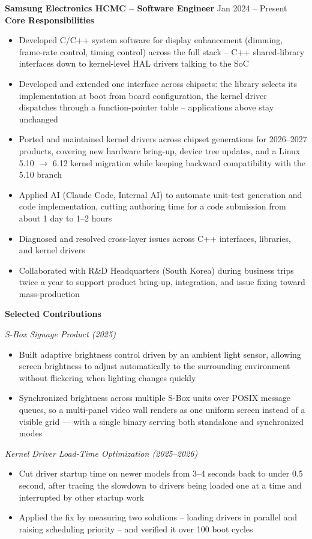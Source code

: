 \documentclass[a4paper,10pt]{article}
\newcommand{\project}[1]{\vspace{2pt}\textit{#1}\vspace{1pt}}
\begin{document}
\textbf{Samsung Electronics HCMC -- Software Engineer} \hfill Jan 2024 -- Present \\[2pt]
\textbf{Core Responsibilities}
\begin{itemize}
\item Developed C/C++ system software for display enhancement (dimming, frame-rate control,
      timing control) across the full stack -- C++ shared-library interfaces down to
      kernel-level HAL drivers talking to the SoC
\item Developed and extended one interface across chipsets: the library
      selects its implementation at boot from board configuration, the kernel driver
      dispatches through a function-pointer table -- applications above stay unchanged
\item Ported and maintained kernel drivers across chipset generations for 2026--2027 products, covering new hardware bring-up, device tree updates, and a Linux 5.10 $\rightarrow$ 6.12 kernel migration while keeping backward compatibility with the 5.10 branch
\item Applied AI (Claude Code, Internal AI) to automate unit-test generation and code implementation, cutting authoring time for a code submission from about 1 day to 1--2 hours
\item Diagnosed and resolved cross-layer issues across C++ interfaces, libraries, and kernel drivers
\item Collaborated with R\&D Headquarters (South Korea) during business trips twice a year to support product bring-up, integration, and issue fixing toward mass-production
\end{itemize}

\vspace{2pt}
\textbf{Selected Contributions}

\project{S-Box Signage Product (2025)}
\begin{itemize}
    \item Built adaptive brightness control driven by an ambient light sensor, allowing screen
      brightness to adjust automatically to the surrounding environment without flickering
      when lighting changes quickly
    \item Synchronized brightness across multiple S-Box units over POSIX message queues, so a multi-panel video wall renders as one uniform screen instead of a visible grid --- with a single binary serving both standalone and synchronized modes
\end{itemize}

\project{Kernel Driver Load-Time Optimization (2025--2026)}
\begin{itemize}
    \item Cut driver startup time on newer models from 3--4 seconds back to under
          0.5 second, after tracing the slowdown to drivers being loaded one at a time
          and interrupted by other startup work
    \item Applied the fix by measuring two solutions -- loading drivers in parallel and
          raising scheduling priority -- and verified it over 100 boot cycles
\end{itemize}
\end{document}
